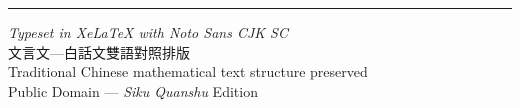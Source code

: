 \documentclass[11pt,a4paper]{article}
\begin{document}
\vspace{2cm}
\begin{center}
\textcolor{rulecolor}{\rule{0.5\textwidth}{0.4pt}}

\vspace{1em}
{\small\color{sectioncolor}
\textit{Typeset in XeLaTeX with Noto Sans CJK SC}\\[0.3em]
文言文—白話文雙語對照排版\\[0.3em]
Traditional Chinese mathematical text structure preserved\\[0.3em]
Public Domain --- \textit{Siku Quanshu} Edition}
\end{center}
\end{document}
